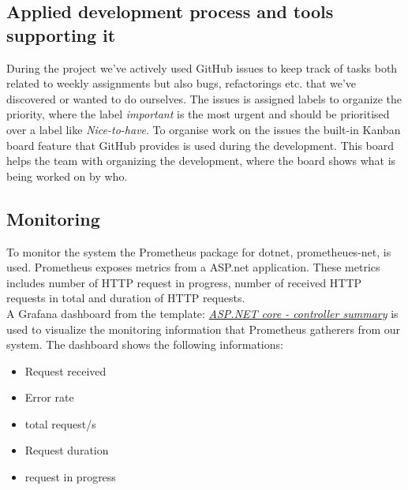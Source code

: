 \subsection{Applied development process and tools supporting it}
During the project we've actively used GitHub issues to keep track of tasks both related to weekly assignments but also bugs, refactorings etc. that we've discovered or wanted to do ourselves. The issues is assigned labels to organize the priority, where the label \textit{important} is the most urgent and should be prioritised over a label like \textit{Nice-to-have}. To organise work on the issues the built-in Kanban board feature that GitHub provides is used during the development. This board helps the team with organizing the development, where the board shows what is being worked on by who.   

\subsection{Monitoring}
To monitor the system the Prometheus package for dotnet, prometheues-net, is used. Prometheus exposes metrics from a ASP.net application. These metrics includes number of HTTP request in progress, number of received HTTP requests in total and duration of HTTP requests.
\\
A Grafana dashboard from the template: \href{https://grafana.com/grafana/dashboards/10915}{\textit{ASP.NET core - controller summary}} is used to visualize the monitoring information that Prometheus gatherers from our system. The dashboard shows the following informations:
\begin{itemize}
    \item Request received
    \item Error rate
    \item total request/s
    \item Request duration
    \item request in progress
\end{itemize}

